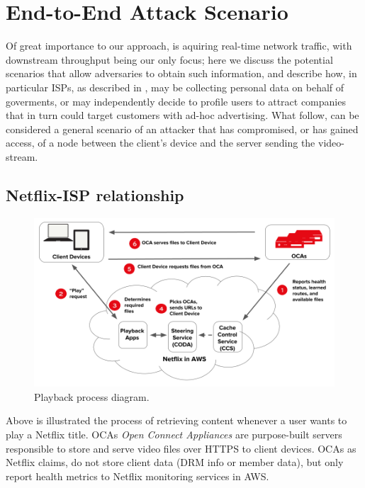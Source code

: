 \chapter{End-to-End Attack Scenario}\label{sec:attack_isp}

Of great importance to our approach, is aquiring real-time network traffic,
with downstream throughput being our only focus; here we discuss the potential
scenarios that allow adversaries to obtain such information, and describe how,
in particular ISPs, as described in , may be collecting
personal data on behalf of goverments, or may independently decide to profile
users to attract companies that in turn could target customers with ad-hoc
advertising. What follow, can be considered a general scenario of an attacker
that has compromised, or has gained access, of a node between the client's
device and the server sending the video-stream.

\section{Netflix-ISP relationship}

\begin{figure}[!htb]
  \centering
  \includegraphics[width=\columnwidth]{img/playback.png}
  \caption{Playback process diagram. \cite{netflix_oca}}
  \label{fig:playback}
\end{figure}

Above is illustrated the process of retrieving content whenever a user wants to
play a Netflix title. OCAs \emph{Open Connect Appliances} are purpose-built
servers responsible to store and serve video files over HTTPS to client
devices.  OCAs as Netflix claims, do not store client data (DRM info or member
data), but only report health metrics to Netflix monitoring services in AWS.

